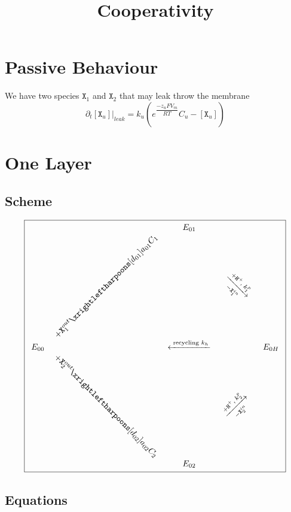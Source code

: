 \documentclass[aps,onecolumn,12pt]{revtex4}
\newcommand{\mychem}[1]{\mathtt{#1}}
\newcommand{\myconc}[1]{\left[#1\right]}
\newcommand{\spx}{\mychem{X}}
\newcommand{\spproton}{\mychem{H^+}}
\begin{document}
\title{Cooperativity}
\maketitle

\section{Passive Behaviour}
We have two species $\spx_1$ and $\spx_2$ that may leak throw the membrane
\begin{equation}
	\partial_t \left.\myconc{\spx_u}\right\vert_{leak} = k_u \left( e^{\dfrac{-z_u F V_m }{RT}} C_u - \myconc{\spx_u}\right)
\end{equation}

\section{One Layer}

\subsection{Scheme}
\begin{equation}
\boxed{
\begin{array}{ccccc}
 & & E_{01}  &  & \\
 &  \rotatebox[origin=c]{45}{$+\spx_1^{out}\xrightleftharpoons[d_{01}]{a_{01}C_1}$} &   & \rotatebox[origin=c]{-45}{$\xrightarrow[-\spx_1^{in}]{+ \spproton, \; k^p_1}$} &  \\
E_{00}  &  & \xleftarrow{\text{ recycling } k_h } &   & E_{0H} \\
  & \rotatebox[origin=c]{-45}{$+\spx_2^{out}\xrightleftharpoons[d_{02}]{a_{02}C_2}$} &   & \rotatebox[origin=c]{+45}{$\xrightarrow[-\spx_2^{in}]{+ \spproton, \; k^p_2}$} & \\
 & & E_{02} & & \\
 \end{array}
 }
\end{equation}

\subsection{Equations}
\end{document}
